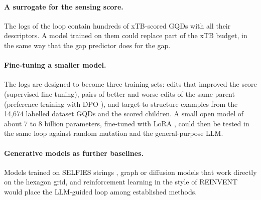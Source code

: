 \paragraph{A surrogate for the sensing score.} The logs of the loop contain hundreds of xTB-scored
GQDs with all their descriptors. A model trained on them could replace part of the xTB budget, in
the same way that the gap predictor does for the gap.

\paragraph{Fine-tuning a smaller model.} The logs are designed to become three training sets: edits
that improved the score (supervised fine-tuning), pairs of better and worse edits of the same
parent (preference training with DPO \cite{rafailov2023dpo}), and target-to-structure examples from
the 14{,}674 labelled dataset GQDs and the scored children. A small open model of about 7 to 8
billion parameters, fine-tuned with LoRA \cite{hu2022lora}, could then be tested in the same loop
against random mutation and the general-purpose LLM.

\paragraph{Generative models as further baselines.} Models trained on SELFIES strings
\cite{krenn2020selfies}, graph or diffusion models that work directly on the hexagon grid, and
reinforcement learning in the style of REINVENT \cite{olivecrona2017reinvent} would place the
LLM-guided loop among established methods.
